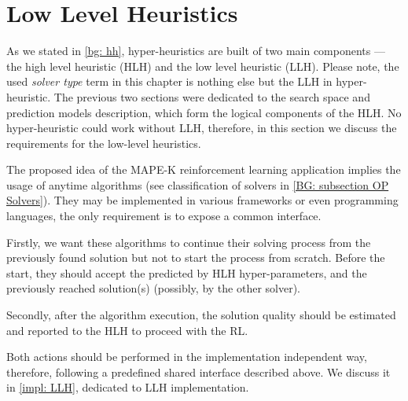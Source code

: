 \section{Low Level Heuristics}\label{concept: llh}
As we stated in \cref{bg: hh}, hyper-heuristics are built of two main components — the high level heuristic (HLH) and the low level heuristic (LLH). Please note, the used \emph{solver type} term in this chapter is nothing else but the LLH in hyper-heuristic. The previous two sections were dedicated to the search space and prediction models description, which form the logical components of the HLH. No hyper-heuristic could work without LLH, therefore, in this section we discuss the requirements for the low-level heuristics.

The proposed idea of the MAPE-K reinforcement learning application implies the usage of anytime algorithms (see classification of solvers in \cref{BG: subsection OP Solvers}).
They may be implemented in various frameworks or even programming languages, the only requirement is to expose a common interface. 

Firstly, we want these algorithms to continue their solving process from the previously found solution but not to start the process from scratch. Before the start, they should accept the predicted by HLH hyper-parameters, and the previously reached solution(s) (possibly, by the other solver). 

Secondly, after the algorithm execution, the solution quality should be estimated and reported to the HLH to proceed with the RL.

Both actions should be performed in the implementation independent way, therefore, following a predefined shared interface described above. We discuss it in \cref{impl: LLH}, dedicated to LLH implementation.


